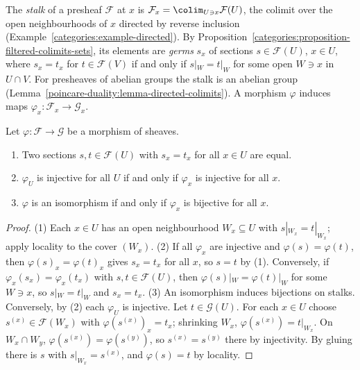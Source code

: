 \begin{definition}\label{sheaves:definition-stalk}
The \emph{stalk} of a presheaf $\mathcal{F}$ at $x$ is $\mathcal{F}_x = \colim_{U \ni x}\mathcal{F}(U)$, the colimit over the open neighbourhoods of $x$ directed by reverse
inclusion (Example~\ref{categories:example-directed}). By Proposition~\ref{categories:proposition-filtered-colimits-sets}, its elements are \emph{germs} $s_x$ of sections
$s \in \mathcal{F}(U)$, $x \in U$, where $s_x = t_x$ for $t \in \mathcal{F}(V)$ if and only if $s|_W = t|_W$ for some open $W \ni x$ in $U \cap V$. For presheaves of abelian groups
the stalk is an abelian group (Lemma~\ref{poincare-duality:lemma-directed-colimits}). A morphism $\varphi$ induces maps $\varphi_x \colon \mathcal{F}_x \to \mathcal{G}_x$.
\end{definition}

\begin{proposition}\label{sheaves:proposition-stalks-detect}
Let $\varphi \colon \mathcal{F} \to \mathcal{G}$ be a morphism of sheaves.
\begin{enumerate}
\item Two sections $s, t \in \mathcal{F}(U)$ with $s_x = t_x$ for all $x \in U$ are equal.
\item $\varphi_U$ is injective for all $U$ if and only if $\varphi_x$ is injective for all $x$.
\item $\varphi$ is an isomorphism if and only if $\varphi_x$ is bijective for all $x$.
\end{enumerate}
\end{proposition}

\begin{proof}
(1) Each $x \in U$ has an open neighbourhood $W_x \subseteq U$ with $s|_{W_x} = t|_{W_x}$; apply locality to the cover $(W_x)$. (2) If all $\varphi_x$ are injective and
$\varphi(s) = \varphi(t)$, then $\varphi(s)_x = \varphi(t)_x$ gives $s_x = t_x$ for all $x$, so $s = t$ by (1). Conversely, if $\varphi_x(s_x) = \varphi_x(t_x)$ with $s, t \in \mathcal{F}(U)$,
then $\varphi(s)|_W = \varphi(t)|_W$ for some $W \ni x$, so $s|_W = t|_W$ and $s_x = t_x$. (3) An isomorphism induces bijections on stalks. Conversely, by (2) each $\varphi_U$ is
injective. Let $t \in \mathcal{G}(U)$. For each $x \in U$ choose $s^{(x)} \in \mathcal{F}(W_x)$ with $\varphi(s^{(x)})_x = t_x$; shrinking $W_x$, $\varphi(s^{(x)}) = t|_{W_x}$. On
$W_x \cap W_y$, $\varphi(s^{(x)}) = \varphi(s^{(y)})$, so $s^{(x)} = s^{(y)}$ there by injectivity. By gluing there is $s$ with $s|_{W_x} = s^{(x)}$, and $\varphi(s) = t$ by locality.
\end{proof}

